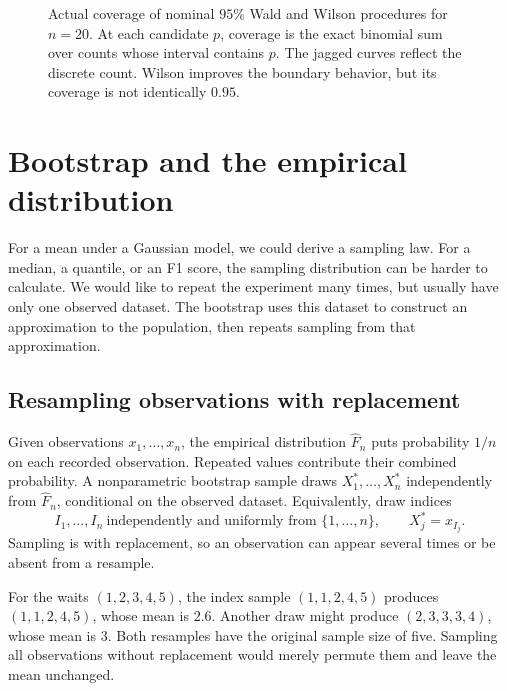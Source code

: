\begin{figure}[H]
  \centering\InfProportionCoveragePlot
  \caption{Actual coverage of nominal \(95\%\) Wald and Wilson
  procedures for \(n=20\). At each candidate \(p\), coverage is the
  exact binomial sum over counts whose interval contains \(p\).
  The jagged curves reflect the discrete count. Wilson improves the
  boundary behavior, but its coverage is not identically \(0.95\).}
  \label{fig:proportion-coverage}
\end{figure}

\section{Bootstrap and the empirical distribution}
\label{sec:bootstrap}

For a mean under a Gaussian model, we could derive a sampling law.
For a median, a quantile, or an F1 score, the sampling distribution
can be harder to calculate. We would like to repeat the experiment
many times, but usually have only one observed dataset. The bootstrap
uses this dataset to construct an approximation to the population,
then repeats sampling from that approximation.

\subsection{Resampling observations with replacement}

\begin{definition}
Given observations \(x_1,\ldots,x_n\), the empirical distribution
\(\widehat F_n\) puts probability \(1/n\) on each recorded observation.
Repeated values contribute their combined probability.
A nonparametric bootstrap sample draws
\(X_1^*,\ldots,X_n^*\) independently from \(\widehat F_n\), conditional
on the observed dataset. Equivalently, draw indices
\[
  I_1,\ldots,I_n\ \text{independently and uniformly from }
  \{1,\ldots,n\},\qquad X_j^*=x_{I_j}.
\]
Sampling is with replacement, so an observation can appear several
times or be absent from a resample.
\end{definition}

For the waits \((1,2,3,4,5)\), the index sample \((1,1,2,4,5)\)
produces \((1,1,2,4,5)\), whose mean is \(2.6\). Another draw might
produce \((2,3,3,3,4)\), whose mean is \(3\). Both resamples have
the original sample size of five. Sampling all observations without
replacement would merely permute them and leave the mean unchanged.

